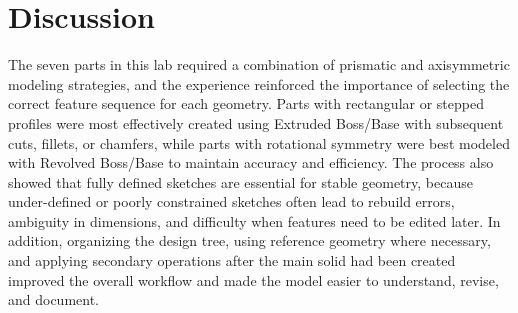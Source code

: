 \section{Discussion}

The seven parts in this lab required a combination of prismatic and axisymmetric modeling strategies, and the experience reinforced the importance of selecting the correct feature sequence for each geometry. Parts with rectangular or stepped profiles were most effectively created using Extruded Boss/Base with subsequent cuts, fillets, or chamfers, while parts with rotational symmetry were best modeled with Revolved Boss/Base to maintain accuracy and efficiency. The process also showed that fully defined sketches are essential for stable geometry, because under-defined or poorly constrained sketches often lead to rebuild errors, ambiguity in dimensions, and difficulty when features need to be edited later. In addition, organizing the design tree, using reference geometry where necessary, and applying secondary operations after the main solid had been created improved the overall workflow and made the model easier to understand, revise, and document.

